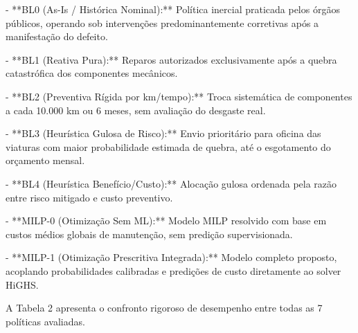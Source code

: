 \documentclass[12pt,a4paper]{article}
\begin{document}
- **BL0 (As-Is / Histórica Nominal):** Política inercial praticada pelos órgãos públicos, operando sob intervenções predominantemente corretivas após a manifestação do defeito.

- **BL1 (Reativa Pura):** Reparos autorizados exclusivamente após a quebra catastrófica dos componentes mecânicos.

- **BL2 (Preventiva Rígida por km/tempo):** Troca sistemática de componentes a cada 10.000 km ou 6 meses, sem avaliação do desgaste real.

- **BL3 (Heurística Gulosa de Risco):** Envio prioritário para oficina das viaturas com maior probabilidade estimada de quebra, até o esgotamento do orçamento mensal.

- **BL4 (Heurística Benefício/Custo):** Alocação gulosa ordenada pela razão entre risco mitigado e custo preventivo.

- **MILP-0 (Otimização Sem ML):** Modelo MILP resolvido com base em custos médios globais de manutenção, sem predição supervisionada.

- **MILP-1 (Otimização Prescritiva Integrada):** Modelo completo proposto, acoplando probabilidades calibradas e predições de custo diretamente ao solver HiGHS.

A Tabela 2 apresenta o confronto rigoroso de desempenho entre todas as 7 políticas avaliadas.

\begin{table}[htbp]
\centering
\small
{}
\end{table}
\end{document}
